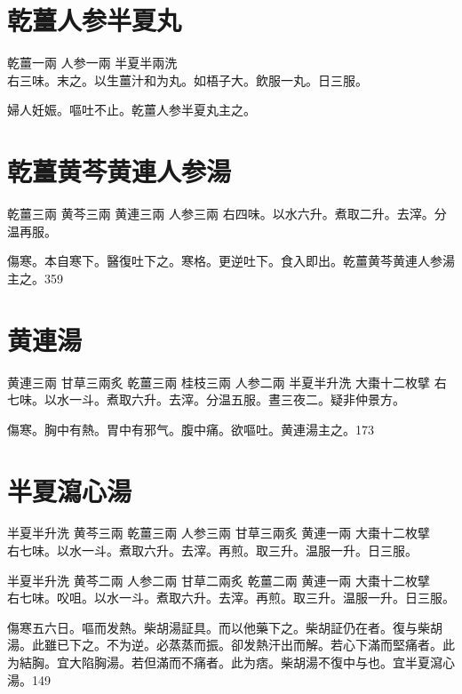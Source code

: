 \section{乾薑人参半夏丸}

乾薑{\scriptsize 一兩} 人参{\scriptsize 一兩} 半夏{\scriptsize 半兩洗}\\
右三味。末之。以生薑汁和为丸。如梧子大。飲服一丸。日三服。

婦人妊娠。嘔吐不止。乾薑人参半夏丸主之。

\section{乾薑黄芩黄連人参湯}

乾薑{\scriptsize 三兩} 黄芩{\scriptsize 三兩} 黄連{\scriptsize 三兩} 人参{\scriptsize 三兩}
右四味。以水六升。煮取二升。去滓。分温再服。

傷寒。本自寒下。醫復吐{\khaai 下}之。寒格。更逆吐{\khaai 下}。食入即出。乾薑黄芩黄連人参湯主之。359

\section{黄連湯}

黄連{\scriptsize 三兩} 甘草{\scriptsize 三兩炙} 乾薑{\scriptsize 三兩} 桂枝{\scriptsize 三兩} 人参{\scriptsize 二兩} 半夏{\scriptsize 半升洗} 大棗{\scriptsize 十二枚擘}
右七味。以水一斗。煮取六升。去滓。分温五服。晝三夜二。疑非仲景方。

傷寒。胸中有熱。胃中有邪气。腹中痛。欲嘔吐。黄連湯主之。173

\section{半夏瀉心湯}

半夏{\scriptsize 半升洗} 黄芩{\scriptsize 三兩} 乾薑{\scriptsize 三兩} 人参{\scriptsize 三兩} 甘草{\scriptsize 三兩炙} 黄連{\scriptsize 一兩} 大棗{\scriptsize 十二枚擘}\\
右七味。以水一斗。煮取六升。去滓。再煎。取三升。温服一升。日三服。{\zhaoben}

半夏{\scriptsize 半升洗} 黄芩{\scriptsize 二兩} 人参{\scriptsize 二兩} 甘草{\scriptsize 二兩炙} 乾薑{\scriptsize 二兩} 黄連{\scriptsize 一兩} 大棗{\scriptsize 十二枚擘}\\
右七味。㕮咀。以水一斗。煮取六升。去滓。再煎。取三升。温服一升。日三服。{\wuben}

傷寒五六日。嘔而发熱。柴胡湯証具。而以他藥下之。柴胡証仍在者。復与柴胡湯。此雖已下之。不为逆。必蒸蒸而振。卻发熱汗出而解。若心下滿而堅痛者。此为結胸。宜大陷胸湯。若但滿而不痛者。此为痞。柴胡{\khaai 湯}不復中与也。宜半夏瀉心湯。149

